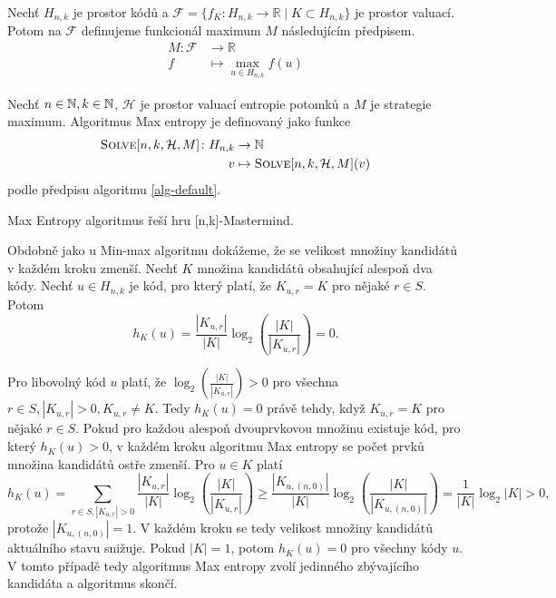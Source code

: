 \begin{definice}\label{defstrategiemaximum}
    Nechť $H_{n,k}$ je prostor kódů a $\mathcal{F} = \{f_K\colon H_{n,k} \to \mathbb{R} \mid K \subset H_{n,k}\}$ je prostor valuací. Potom na $\mathcal{F}$ definujeme funkcionál maximum $M$ následujícím předpisem.
    \begin{align*}
        M \colon \mathcal{F} &\to \mathbb{R} \\
        f &\mapsto \max_{u\in H_{n,k}} f(u)
    \end{align*}
\end{definice}



\begin{definice}
    Nechť $n\in \mathbb{N}, k\in \mathbb{N}$, $\mathcal{H}$ je prostor valuací entropie potomků a $M$ je strategie maximum. Algoritmus Max entropy je definovaný jako funkce 
    \begin{align*}
        \textsc{Solve}[n, k, \mathcal{H}, M] \colon H_{n,k} &\to \mathbb{N} \\
        v & \mapsto \textsc{Solve}[n, k, \mathcal{H}, M](v)
    \end{align*}
    podle předpisu algoritmu \ref{alg-default}.
\end{definice}

\begin{tvrz}
    Max Entropy algoritmus řeší hru [n,k]-Mastermind.
\end{tvrz}
\begin{dukaz}
    Obdobně jako u Min-max algoritmu dokážeme, že se velikost množiny kandidátů v každém kroku zmenší. Nechť $K$ množina kandidátů obsahující alespoň dva kódy. 
    Nechť $u\in H_{n,k}$ je kód, pro který platí, že $K_{u,r} = K$ pro nějaké $r\in S$. Potom 
    \[h_K(u) = \frac{|K_{u,r}|}{|K|}\log_2\left( \frac{|K|}{|K_{u,r}|} \right) = 0.\]
    
    Pro libovolný kód $u$ platí, že $\log_2\left( \frac{|K|}{|K_{u,r}|} \right)  > 0 $ pro všechna $r\in S, |K_{u,r}| > 0, K_{u,r} \neq K$. Tedy $h_K(u) = 0$ právě tehdy, když $K_{u,r} = K$ pro nějaké $r\in S$. Pokud pro každou alespoň dvouprvkovou množinu existuje kód, pro který $h_K(u) > 0$, v každém kroku algoritmu Max entropy se počet prvků množina kandidátů ostře zmenší. Pro $u \in K$ platí
    \[h_K(u) = \sum_{r\in S, |K_{u,r}| > 0} \frac{|K_{u,r}|}{|K|}\log_2\left( \frac{|K|}{|K_{u,r}|} \right) 
    \geq 
    \frac{|K_{u,(n,0)}|}{|K|}\log_2\left( \frac{|K|}{|K_{u,(n,0)}|} \right)
    = \frac{1}{|K|} \log_2 |K| > 0,
    \]
    protože $|K_{u,(n,0)}| = 1$. V každém kroku se tedy velikost množiny kandidátů aktuálního stavu snižuje. Pokud $|K| = 1$, potom $h_K(u) = 0$ pro všechny kódy $u$. V tomto případě tedy algoritmus Max entropy zvolí jedinného zbývajícího kandidáta a algoritmus skončí. 
\end{dukaz}

